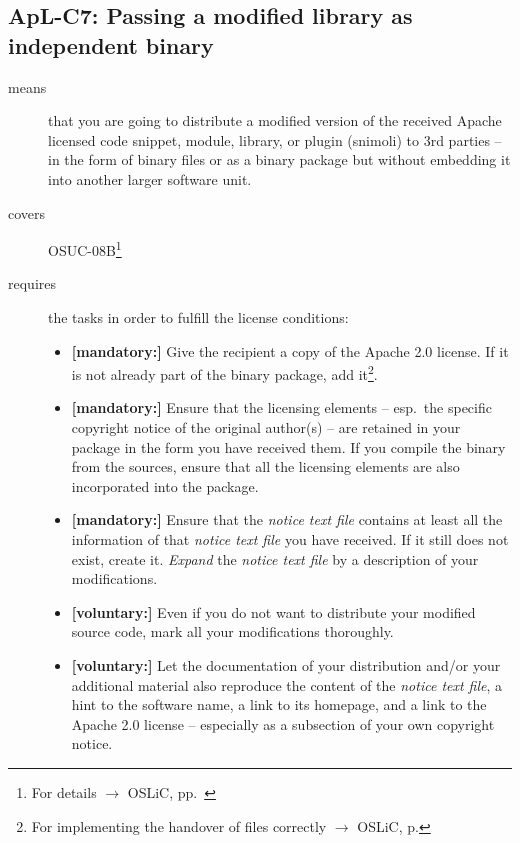 \subsection{ApL-C7: Passing a modified library as independent binary}
\label{OSUC-08B-Apache20}
\begin{description}
\item[means] that you are going to distribute a modified version of the received
Apache licensed code snippet, module, library, or plugin (snimoli) to 3rd
parties -- in the form of binary files or as a binary package but without
embedding it into another larger software unit.
\item[covers] OSUC-08B\footnote{For details $\rightarrow$ OSLiC, pp.\
\pageref{OSUC-08B-DEF}}
\item[requires] the tasks in order to fulfill the license conditions:
\begin{itemize}
  
 \item \textbf{[mandatory:]} Give the recipient a copy of the Apache 2.0
  license. If it is not already part of the binary package, add
  it\footnote{For implementing the handover of files correctly $\rightarrow$
  OSLiC, p. \pageref{DistributingFilesHint}}.
  
  \item \textbf{[mandatory:]} Ensure that the licensing elements -- esp.\ the
  specific copyright notice of the original author(s) -- are retained in your
  package in the form you have received them. If you compile the binary from the
  sources, ensure that all the licensing elements are also incorporated into the
  package.
  
  \item \textbf{[mandatory:]} Ensure that the \emph{notice text file} contains
  at least all the information of that \emph{notice text file} you have
  received. If it still does not exist, create it. \emph{Expand} the
  \emph{notice text file} by a description of your modifications.
   
  \item \textbf{[voluntary:]} Even if you do not want to distribute your
  modified source code, mark all your modifications thoroughly.
 
  \item \textbf{[voluntary:]} Let the documentation of your distribution and/or
  your additional material also reproduce the content of the \emph{notice text
  file}, a hint to the software name, a link to its homepage, and a link to the
  Apache 2.0 license -- especially as a subsection of your own copyright notice.
  

\end{itemize}
\end{description}
